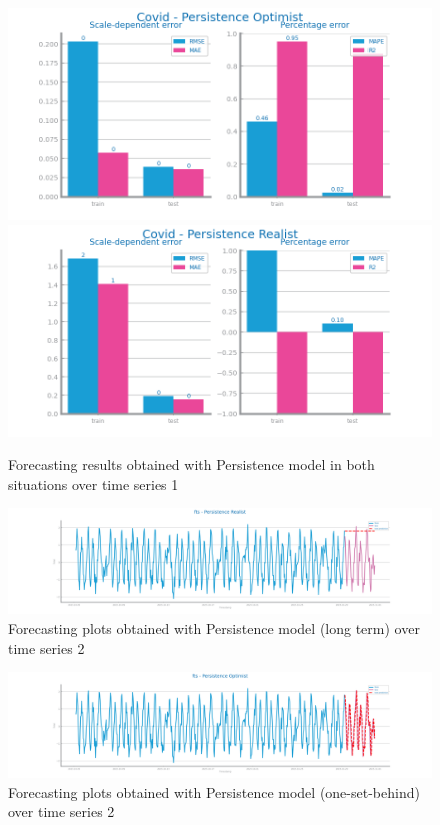 \documentclass[10pt]{extarticle}
\begin{document}
\begin{figure}[H]
\centering\includegraphics[scale=0.5]{images/dataset1/time_series/Covid - Persistence Optimist_forecasting_eval.png}
\centering\includegraphics[scale=0.5]{images/dataset1/time_series/Covid - Persistence Realist_forecasting_eval.png}
\caption{Forecasting results obtained with Persistence model in both situations over time series 1}
\end{figure}

\begin{figure}[H]
\centering\includegraphics[scale=0.4]{images/dataset2/time_series/fts_persistence_real_forecast.png}
\caption{Forecasting plots obtained with Persistence model (long term) over time series 2}
\end{figure}

\begin{figure}[H]
\centering\includegraphics[scale=0.4]{images/dataset2/time_series/fts_persistence_optim_forecast.png}
\caption{Forecasting plots obtained with Persistence model (one-set-behind) over time series 2}
\end{figure}
\end{document}

